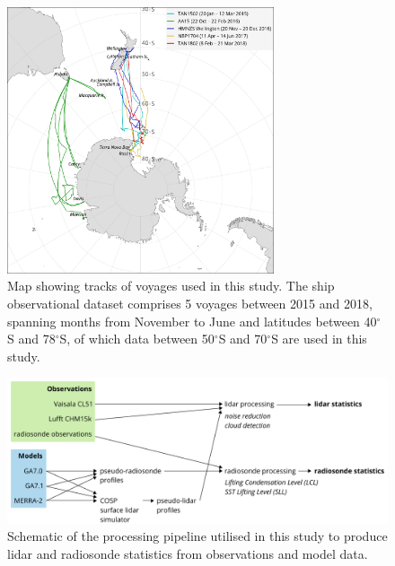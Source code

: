 \clearpage
\begin{figure}[t]
\centering
\includegraphics[width=0.7\textwidth]{chapter2/fig/map_rev2.pdf}
\caption[Map showing tracks of voyages]{
Map showing tracks of voyages used in this study. The ship observational dataset
comprises 5 voyages between 2015 and 2018, spanning months from November to June
and latitudes between 40$^\circ$S and 78$^\circ$S, of which data between
50$^\circ$S and 70$^\circ$S are used in this study.
}
\label{fig:map}
\end{figure}

\clearpage
\begin{figure}[t]
\centering
\includegraphics[width=\textwidth]{chapter2/fig/schematic.pdf}
\caption[Schematic of the processing pipeline]{
Schematic of the processing pipeline utilised in this study to produce lidar and
radiosonde statistics from observations and model data.
}
\label{fig:schematic}
\end{figure}

